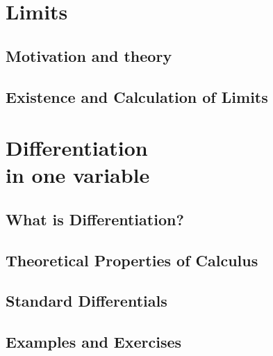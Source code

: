 \part{Limits}

\chapter{Motivation and theory}



\chapter{Existence and Calculation of Limits}






\part{Differentiation \\ \quad in one variable }

\chapter{What is Differentiation?}



\chapter{Theoretical Properties of Calculus}



\chapter{Standard Differentials}



\chapter{Examples and Exercises}



